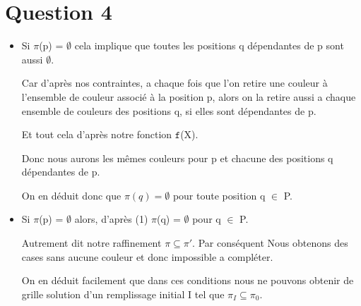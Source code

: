 
\section{Question 4}

\bigskip
\begin{itemize}
\item Si $\pi$(p) = $\emptyset$ cela implique que toutes les positions q d\'ependantes de p sont aussi $\emptyset$. 

Car d'apr\`es nos contraintes, a chaque fois que l'on retire une couleur \`a l'ensemble de couleur associ\'e \`a la position p, alors on la retire aussi a chaque ensemble de couleurs des positions q, si elles sont d\'ependantes de p. 

Et tout cela d'apr\`es notre fonction $\mathtt{f}$(X). 

Donc nous aurons les m\^emes couleurs pour p et chacune des positions q d\'ependantes de p.

\bigskip
On en d\'eduit donc que $\pi(q)=\emptyset$ pour toute position q $\in$ P.

\bigskip
\item Si $\pi$(p) = $\emptyset$ alors, d'apr\`es (1) $\pi$(q) = $\emptyset$ pour q $\in$ P. 

Autrement dit notre raffinement $\pi \subseteq \pi'$. Par cons\'equent Nous obtenons des cases sans aucune couleur et donc impossible a compl\'eter. 

\bigskip
On en d\'eduit facilement que dans ces conditions nous ne pouvons obtenir de grille solution d'un remplissage initial I tel que $\pi_I \subseteq \pi_0$.
\end{itemize}